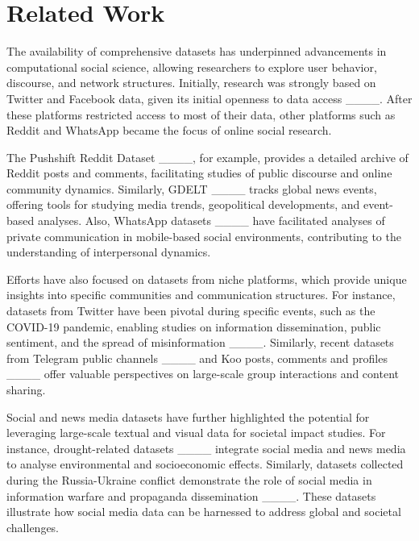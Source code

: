 \section{Related Work}


The availability of comprehensive datasets has underpinned advancements in computational social science, allowing researchers to explore user behavior, discourse, and network structures. Initially, research was strongly based on Twitter and Facebook data, given its initial openness to data access ____. After these platforms restricted access to most of their data, other platforms such as Reddit and WhatsApp became the focus of online social research. 

The Pushshift Reddit Dataset ____, for example, provides a detailed archive of Reddit posts and comments, facilitating studies of public discourse and online community dynamics. Similarly, GDELT ____ tracks global news events, offering tools for studying media trends, geopolitical developments, and event-based analyses. Also, WhatsApp datasets ____ have facilitated analyses of private communication in mobile-based social environments, contributing to the understanding of interpersonal dynamics.

Efforts have also focused on datasets from niche platforms, which provide unique insights into specific communities and communication structures. For instance, datasets from Twitter have been pivotal during specific events, such as the COVID-19 pandemic, enabling studies on information dissemination, public sentiment, and the spread of misinformation ____. Similarly, recent datasets from Telegram public channels ____ and Koo posts, comments and profiles ____ offer valuable perspectives on large-scale group interactions and content sharing. 

Social and news media datasets have further highlighted the potential for leveraging large-scale textual and visual data for societal impact studies. For instance, drought-related datasets ____ integrate social media and news media to analyse environmental and socioeconomic effects. Similarly, datasets collected during the Russia-Ukraine conflict demonstrate the role of social media in information warfare and propaganda dissemination ____. These datasets illustrate how social media data can be harnessed to address global and societal challenges.

